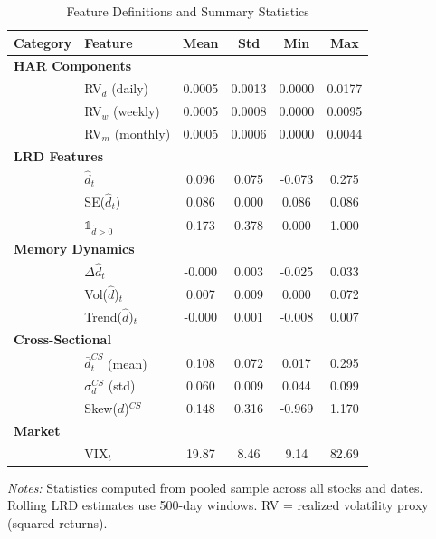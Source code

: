 \begin{table}[htbp]
\centering
\caption{Feature Definitions and Summary Statistics}
\label{tab:features}
\small
\begin{tabular}{llcccc}
\toprule
Category & Feature & Mean & Std & Min & Max \\
\midrule
\multicolumn{6}{l}{\textbf{HAR Components}} \\
  & RV$_d$ (daily) & 0.0005 & 0.0013 & 0.0000 & 0.0177 \\
  & RV$_w$ (weekly) & 0.0005 & 0.0008 & 0.0000 & 0.0095 \\
  & RV$_m$ (monthly) & 0.0005 & 0.0006 & 0.0000 & 0.0044 \\
\midrule
\multicolumn{6}{l}{\textbf{LRD Features}} \\
  & $\hat{d}_t$ & 0.096 & 0.075 & -0.073 & 0.275 \\
  & SE($\hat{d}_t$) & 0.086 & 0.000 & 0.086 & 0.086 \\
  & $\mathbb{1}_{\hat{d}>0}$ & 0.173 & 0.378 & 0.000 & 1.000 \\
\midrule
\multicolumn{6}{l}{\textbf{Memory Dynamics}} \\
  & $\Delta\hat{d}_t$ & -0.000 & 0.003 & -0.025 & 0.033 \\
  & Vol($\hat{d}$)$_t$ & 0.007 & 0.009 & 0.000 & 0.072 \\
  & Trend($\hat{d}$)$_t$ & -0.000 & 0.001 & -0.008 & 0.007 \\
\midrule
\multicolumn{6}{l}{\textbf{Cross-Sectional}} \\
  & $\bar{d}_t^{CS}$ (mean) & 0.108 & 0.072 & 0.017 & 0.295 \\
  & $\sigma_d^{CS}$ (std) & 0.060 & 0.009 & 0.044 & 0.099 \\
  & Skew($d$)$^{CS}$ & 0.148 & 0.316 & -0.969 & 1.170 \\
\midrule
\multicolumn{6}{l}{\textbf{Market}} \\
  & VIX$_t$ & 19.87 & 8.46 & 9.14 & 82.69 \\
\bottomrule
\end{tabular}
\begin{tablenotes}\small
\item \textit{Notes:} Statistics computed from pooled sample across all stocks and dates. Rolling LRD estimates use 500-day windows. RV = realized volatility proxy (squared returns).
\end{tablenotes}
\end{table}


